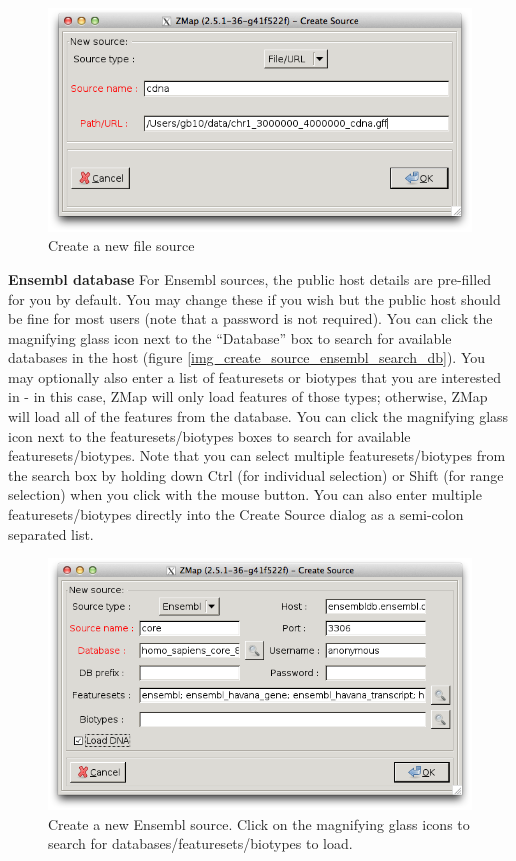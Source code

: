 \documentclass[letterpaper]{article}
\begin{document}
\begin{figure}
\centering
\color[rgb]{0.30980393,0.5058824,0.7411765}
\includegraphics[resolution=150]{images/create_source_file.png}
\caption{Create a new file source}
\label{img_create_source_file}
\end{figure}

\textbf{Ensembl database}
For Ensembl sources, the public host details are pre-filled for you by default. You may change these if you wish but the public host should be fine for most users (note that a password is not required). You can click the magnifying glass icon next to the ``Database'' box to search for available databases in the host (figure \ref{img_create_source_ensembl_search_db}). You may optionally also enter a list of featuresets or biotypes that you are interested in - in this case, ZMap will only load features of those types; otherwise, ZMap will load all of the features from the database. You can click the magnifying glass icon next to the featuresets/biotypes boxes to search for available featuresets/biotypes. Note that you can select multiple featuresets/biotypes from the search box by holding down Ctrl (for individual selection) or Shift (for range selection) when you click with the mouse button. You can also enter multiple featuresets/biotypes directly into the Create Source dialog as a semi-colon separated list.

\begin{figure}
\centering
\color[rgb]{0.30980393,0.5058824,0.7411765}
\includegraphics[resolution=150]{images/create_source_ensembl.png}
\caption{Create a new Ensembl source. Click on the magnifying glass icons to search for databases/featuresets/biotypes to load.}
\label{img_create_source_ensembl}
\end{figure}
\end{document}
